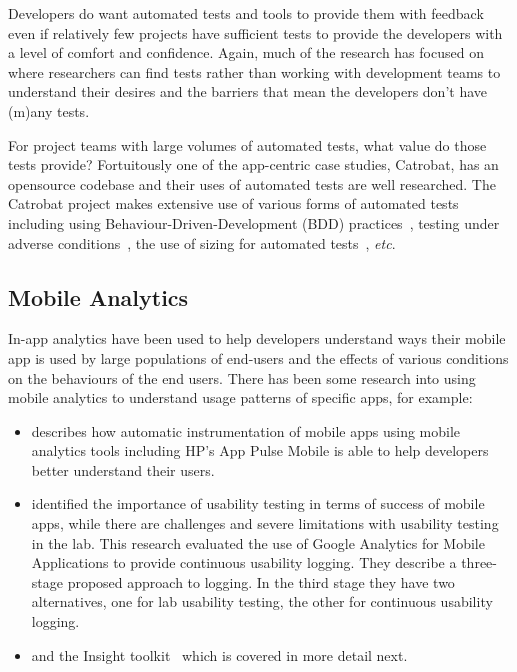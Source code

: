 Developers do want automated tests and tools to provide them with feedback~\citep[p. 5]{greiler2022_an_actionable_framework_for_understanding_and_improving_developer_experience} even if relatively few projects have sufficient tests to provide the developers with a level of comfort and confidence. Again, much of the research has focused on where researchers can find tests rather than working with development teams to understand their desires and the barriers that mean the developers don't have (m)any tests. 

For project teams with large volumes of automated tests, what value do those tests provide? Fortuitously one of the app-centric case studies, Catrobat, has an opensource codebase and their uses of automated tests are well researched. The Catrobat project makes extensive use of various forms of automated tests including using Behaviour-Driven-Development (BDD) practices~\citet{ali2019using_catrobat}, testing under adverse conditions~\citet{adamsen2015systematic_catrobat}, the use of sizing for automated tests~\citet{hirsch2019approach_catrobat}, \emph{etc}. %

\subsection{Mobile Analytics}
In-app analytics have been used to help developers understand ways their mobile app is used by large populations of end-users and the effects of various conditions on the behaviours of the end users. There has been some research into using mobile analytics to understand usage patterns of specific apps, for example:

\begin{itemize}
    \item \citet{parate2016_RECKON_an_analytics_framework_for_app_developers_HP_AppPulseMobile} describes how automatic instrumentation of mobile apps using mobile analytics tools including HP's App Pulse Mobile is able to help developers better understand their users.
    \item \citet{ferre2017_extending_mobile_app_analytics_for_usability_test_logging} identified the importance of usability testing in terms of success of mobile apps, while there are challenges and severe limitations with usability testing in the lab. This research evaluated the use of Google Analytics for Mobile Applications to provide continuous usability logging. They describe a three-stage proposed approach to logging. In the third stage they have two alternatives, one for lab usability testing, the other for continuous usability logging.
    \item and the Insight toolkit~\citet{patro2013_capturing_mobile_experience_in_the_wild} which is covered in more detail next.
\end{itemize}   

